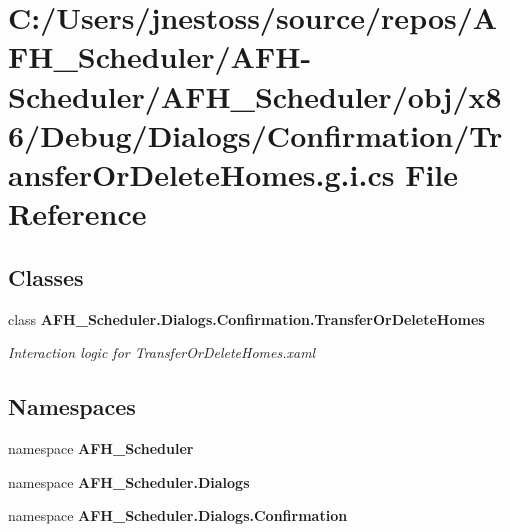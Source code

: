 \section{C\+:/\+Users/jnestoss/source/repos/\+A\+F\+H\+\_\+\+Scheduler/\+A\+F\+H-\/\+Scheduler/\+A\+F\+H\+\_\+\+Scheduler/obj/x86/\+Debug/\+Dialogs/\+Confirmation/\+Transfer\+Or\+Delete\+Homes.g.\+i.\+cs File Reference}
\label{x86_2_debug_2_dialogs_2_confirmation_2_transfer_or_delete_homes_8g_8i_8cs}
\subsection*{Classes}
\begin{DoxyCompactItemize}
\item 
class \textbf{ A\+F\+H\+\_\+\+Scheduler.\+Dialogs.\+Confirmation.\+Transfer\+Or\+Delete\+Homes}
\begin{DoxyCompactList}\small\item\em Interaction logic for Transfer\+Or\+Delete\+Homes.\+xaml \end{DoxyCompactList}\end{DoxyCompactItemize}
\subsection*{Namespaces}
\begin{DoxyCompactItemize}
\item 
namespace \textbf{ A\+F\+H\+\_\+\+Scheduler}
\item 
namespace \textbf{ A\+F\+H\+\_\+\+Scheduler.\+Dialogs}
\item 
namespace \textbf{ A\+F\+H\+\_\+\+Scheduler.\+Dialogs.\+Confirmation}
\end{DoxyCompactItemize}
